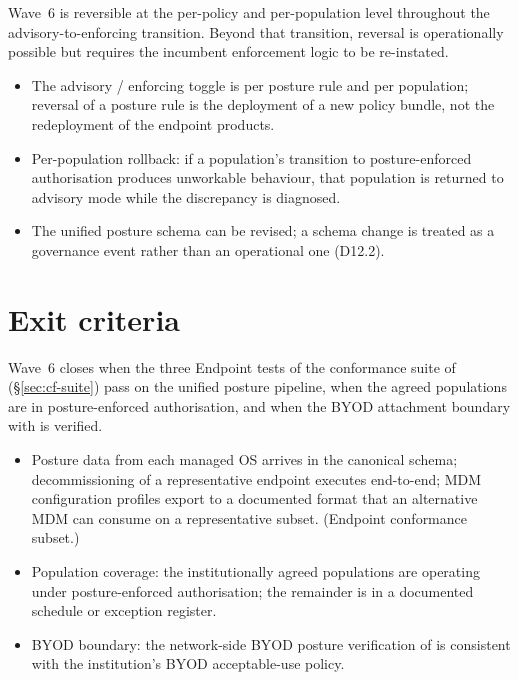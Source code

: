 Wave~6 is reversible at the per-policy and per-population level
throughout the advisory-to-enforcing transition. Beyond that
transition, reversal is operationally possible but requires the
incumbent enforcement logic to be re-instated.

\begin{itemize}[leftmargin=1.5em,nosep]
  \item The advisory / enforcing toggle is per posture rule and per
    population; reversal of a posture rule is the deployment of a
    new policy bundle, not the redeployment of the endpoint
    products.
  \item Per-population rollback: if a population's transition to
    posture-enforced authorisation produces unworkable behaviour,
    that population is returned to advisory mode while the
    discrepancy is diagnosed.
  \item The unified posture schema can be revised; a schema change
    is treated as a governance event rather than an operational
    one (D12.2).
\end{itemize}

\section{Exit criteria}
\label{sec:w6-exit}

Wave~6 closes when the three Endpoint tests of the conformance
suite of  (\S\ref{sec:cf-suite}) pass on
the unified posture pipeline, when the agreed populations are in
posture-enforced authorisation, and when the BYOD attachment
boundary with  is verified.

\begin{itemize}[leftmargin=1.5em,nosep]
  \item Posture data from each managed OS arrives in the canonical
    schema; decommissioning of a representative endpoint executes
    end-to-end; MDM configuration profiles export to a documented
    format that an alternative MDM can consume on a representative
    subset. (Endpoint conformance subset.)
  \item Population coverage: the institutionally agreed populations
    are operating under posture-enforced authorisation; the
    remainder is in a documented schedule or exception register.
  \item BYOD boundary: the network-side BYOD posture verification
    of  is consistent with the institution's
    BYOD acceptable-use policy.
\end{itemize}

